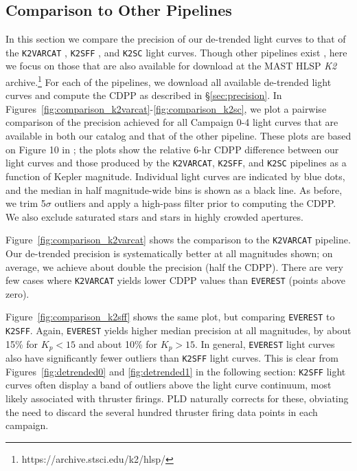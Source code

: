\documentclass[]{emulateapj}
\begin{document}
\subsection{Comparison to Other Pipelines}
\label{sec:comparison}
In this section we compare the precision of our de-trended light curves to that of the
\texttt{K2VARCAT} \citep{ARM15}, \texttt{K2SFF} \citep{VJ14}, and \texttt{K2SC} \citep{AIG16} light curves. Though other
pipelines exist \citep[e.g.,][]{LUN15, HUA15, CRO15}, here we focus on those that 
are also available for download at
the MAST HLSP \emph{K2} archive.\footnote{https://archive.stsci.edu/k2/hlsp/}
For each of the pipelines, we download all available de-trended light curves and
compute the CDPP as described in \S\ref{sec:precision}. In 
Figures~\ref{fig:comparison_k2varcat}-\ref{fig:comparison_k2sc}, we plot a pairwise
comparison of the precision achieved for all Campaign 0-4 light curves that are
available in both our catalog and that of the other pipeline. These plots are based
on Figure 10 in \cite{AIG16}; the plots show the relative 6-hr CDPP difference between
our light curves and those produced by the \texttt{K2VARCAT}, \texttt{K2SFF}, and \texttt{K2SC}
pipelines as a function of Kepler magnitude. Individual light curves are indicated by
blue dots, and the median in half magnitude-wide bins is shown as a black line.
As before, we trim
5$\sigma$ outliers and apply a high-pass filter prior to computing the CDPP.
We also exclude saturated stars and stars in highly crowded apertures.

Figure~\ref{fig:comparison_k2varcat} shows the comparison to the \texttt{K2VARCAT}
pipeline. Our de-trended precision is systematically better at all magnitudes shown;
on average, we achieve about double the precision (half the CDPP). There are very
few cases where \texttt{K2VARCAT} yields lower CDPP values than \texttt{EVEREST}
(points above zero).

Figure~\ref{fig:comparison_k2sff} shows the same plot, but comparing \texttt{EVEREST} to
\texttt{K2SFF}. Again, \texttt{EVEREST} yields higher median precision at all
magnitudes, by about 15\% for $K_p < 15$ and about 10\% for $K_p > 15$. In general, \texttt{EVEREST}
light curves also have significantly fewer outliers than \texttt{K2SFF} light curves.
This is clear from Figures~\ref{fig:detrended0} and \ref{fig:detrended1} in the
following section: \texttt{K2SFF} light curves often display a band of outliers
above the light curve continuum, most likely associated with thruster firings. PLD
naturally corrects for these, obviating the need to discard the several hundred thruster
firing data points in each campaign.
\end{document}
